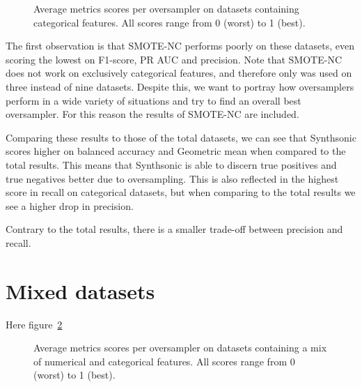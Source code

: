 \begin{figure}[htp]
\centering
    \quad
    
    \medskip
     \quad
    
    \medskip
    \quad
    
\caption{Average metrics scores per oversampler on datasets containing categorical features. All scores range from 0 (worst) to 1 (best).}
\label{fig:Categorical}
\end{figure}

The first observation is that SMOTE-NC performs poorly on these datasets, even scoring the lowest on F1-score, PR AUC and precision. Note that SMOTE-NC does not work on exclusively categorical features, and therefore only was used on three instead of nine datasets. Despite this, we want to portray how oversamplers perform in a wide variety of situations and try to find an overall best oversampler. For this reason the results of SMOTE-NC are included.

Comparing these results to those of the total datasets, we can see that Synthsonic scores higher on balanced accuracy and Geometric mean when compared to the total results. This means that Synthsonic is able to discern true positives and true negatives better due to oversampling. This is also reflected in the highest score in recall on categorical datasets, but when comparing to the total results we see a higher drop in precision. 

Contrary to the total results, there is a smaller trade-off between precision and recall.

\section{Mixed datasets}
Here figure~\ref{fig:mixed}

\begin{figure}[htp]
\centering
    \quad
    
    \medskip
     \quad
    
    \medskip
    \quad
    
\caption{Average metrics scores per oversampler on datasets containing a mix of numerical and categorical features. All scores range from 0 (worst) to 1 (best).}
\label{fig:mixed}
\end{figure}


